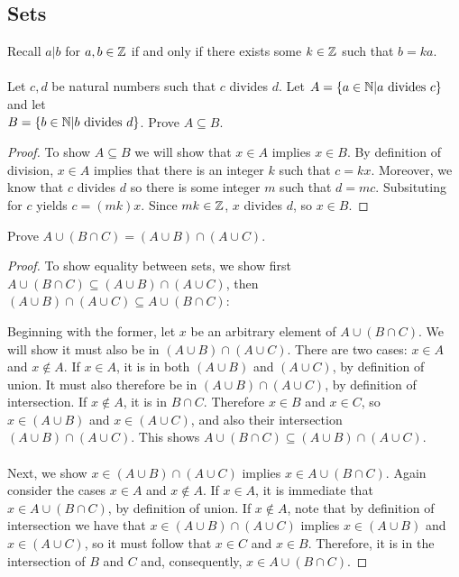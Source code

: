 \documentclass[]{exam}
\begin{document}
\begin{questions}
\newpage
\section*{Sets}
\question
Recall $a|b$ for $a,b \in \mathbb{Z}$ if and only if there exists some $k \in \mathbb{Z}$ such that $b = ka$.
\\~\\
Let $c, d$ be natural numbers such that $c$ divides $d$.
   Let $A = \{a \in \mathbb{N}| a \text{ divides } c \}$ and let\\ 
   $B = \{b \in \mathbb{N}| b\text{ divides }d \}$. Prove $A \subseteq B$.

\begin{solution}
\begin{proof}
To show $A \subseteq B$ we will show that $x \in A$ implies $x \in B$.
By definition of division, $x \in A$ implies that there is an integer
$k$ such that $c = kx$. Moreover, we know that $c$ divides $d$ so
there is some integer $m$ such that $d = mc$. Subsituting for
$c$ yields $c = (mk)x$. Since $mk \in \mathbb{Z}$, $x$ divides $d$, so $x \in B$.
\end{proof}
\end{solution}


\question
Prove $A \cup (B \cap C) = (A \cup B) \cap (A \cup C)$.
\begin{solution}
\begin{proof}
To show equality between sets, we show first $A \cup (B \cap C) \subseteq (A
    \cup B) \cap (A \cup C)$, then 
$(A \cup B) \cap (A \cup C) \subseteq A \cup (B \cap C)$:

Beginning with the former, let $x$ be an arbitrary element of 
$A \cup (B \cap C)$. We will show it must also be in $(A \cup B) \cap (A \cup C)$. 
There are two cases: $x \in A$ and $x \notin A$. If $x \in A$, it is in both
 $(A \cup B)$ and $(A \cup C)$, by definition of union. It must also therefore
 be in $(A \cup B) \cap (A \cup C)$, by definition of intersection. If $x \notin A$, 
 it is in $B \cap C$. Therefore $x \in B$ and $x \in C$, so $x \in (A \cup B)$ and 
 $x \in (A \cup C)$, and also their intersection $(A \cup B) \cap (A \cup C)$.
This shows $A \cup (B \cap C) \subseteq (A \cup B) \cap (A \cup C)$.
\\~\\
Next, we show $x \in (A \cup B) \cap (A \cup C)$ implies 
$x \in A \cup (B \cap C)$. Again consider the cases $x \in A$ and $x \notin A$.
If $x \in A$, it is immediate that $x \in A \cup (B \cap C)$, by definition
of union. If $x \notin A$, note that by definition of intersection we have that
$x \in (A \cup B) \cap (A \cup C)$ implies $x \in (A \cup B)$ and $x \in (A \cup C)$,
so it must follow that $x \in C$ and $x \in B$. Therefore, it is in the
intersection of $B$ and $C$ and, consequently, $x \in A \cup (B \cap C)$.


\end{proof}
\end{solution}
\end{questions}
\end{document}
